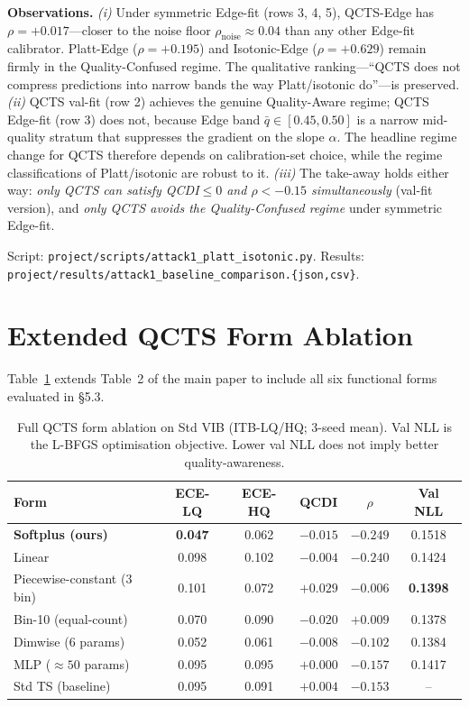 \documentclass{bmvc2k}
\newcommand{\qbar}{\bar{q}}
\begin{document}
\textbf{Observations.} \emph{(i)} Under symmetric Edge-fit (rows 3, 4, 5), QCTS-Edge has $\rho{=}+0.017$---closer to the noise floor $\rho_\text{noise}{\approx}0.04$ than any other Edge-fit calibrator. Platt-Edge ($\rho{=}+0.195$) and Isotonic-Edge ($\rho{=}+0.629$) remain firmly in the Quality-Confused regime. The qualitative ranking---``QCTS does not compress predictions into narrow bands the way Platt/isotonic do''---is preserved. \emph{(ii)} QCTS val-fit (row 2) achieves the genuine Quality-Aware regime; QCTS Edge-fit (row 3) does not, because Edge band $\qbar\in[0.45,0.50]$ is a narrow mid-quality stratum that suppresses the gradient on the slope $\alpha$. The headline regime change for QCTS therefore depends on calibration-set choice, while the regime classifications of Platt/isotonic are robust to it. \emph{(iii)} The take-away holds either way: \emph{only QCTS can satisfy QCDI${\le}0$ and $\rho{<}-0.15$ simultaneously} (val-fit version), and \emph{only QCTS avoids the Quality-Confused regime} under symmetric Edge-fit.

Script: \texttt{project/scripts/attack1\_platt\_isotonic.py}.
Results: \texttt{project/results/attack1\_baseline\_comparison.\{json,csv\}}.

\section{Extended QCTS Form Ablation}
\label{app:form_ablation}

Table~\ref{tab:form_ablation_full} extends Table~2 of the main paper to include all six functional forms evaluated in \S5.3.

\begin{table}[h]
\centering
\caption{Full QCTS form ablation on Std VIB (ITB-LQ/HQ; 3-seed mean). Val NLL is the L-BFGS optimisation objective. Lower val NLL does not imply better quality-awareness.}
\label{tab:form_ablation_full}
\footnotesize
\begin{tabular}{lccccc}
\toprule
Form & ECE-LQ & ECE-HQ & QCDI & $\rho$ & Val NLL \\
\midrule
\textbf{Softplus (ours)} & \textbf{0.047} & 0.062 & $\mathbf{-0.015}$ & $\mathbf{-0.249}$ & 0.1518 \\
Linear                   & 0.098 & 0.102 & $-0.004$ & $-0.240$ & 0.1424 \\
Piecewise-constant (3 bin) & 0.101 & 0.072 & $+0.029$ & $-0.006$ & \textbf{0.1398} \\
Bin-10 (equal-count)     & 0.070 & 0.090 & $-0.020$ & $+0.009$ & 0.1378 \\
Dimwise ($6$ params)     & 0.052 & 0.061 & $-0.008$ & $-0.102$ & 0.1384 \\
MLP ($\approx50$ params) & 0.095 & 0.095 & $+0.000$ & $-0.157$ & 0.1417 \\
\midrule
Std TS (baseline)        & 0.095 & 0.091 & $+0.004$ & $-0.153$ & -- \\
\bottomrule
\end{tabular}
\end{table}
\end{document}
